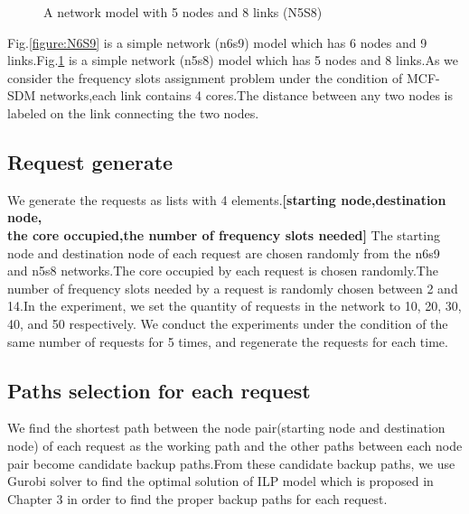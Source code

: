 \documentclass[a4paper,11pt]{report}
\begin{document}
        \begin{figure}[htbp]
        \begin{center}
        \end{center}
        \caption{A network model with 5 nodes and 8 links (N5S8)}
        \label{figure:N5S8}
        \end{figure} 

     Fig.\ref{figure:N6S9} is a simple network (n6s9) model which has 6 nodes and 9 links.Fig.\ref{figure:N5S8} is a simple network (n5s8) model which has 5 nodes and 8 links.As we consider the frequency slots assignment problem under the condition of MCF-SDM networks,each link contains 4 cores.The distance between any two nodes is labeled on the link connecting the two nodes.\par 
        
\subsection{Request generate}
    We generate the requests as lists with 4 elements.\textbf{[starting node,destination node,\\
    the core occupied,the number of frequency slots needed]}
    The starting node and destination node of each request are chosen randomly from the n6s9 and n5s8 networks.The core occupied by each request is chosen randomly.The number of frequency slots needed by a request is randomly chosen between 2 and 14.In the experiment, we set the quantity of requests in the network to 10, 20, 30, 40, and 50 respectively. We conduct the experiments under the condition of the same number of requests for 5 times, and regenerate the requests for each time.

    
\subsection{Paths selection for each request}
    We find the shortest path between the node pair(starting node and destination node) of each request as the working path and the other paths between each node pair become candidate backup paths.From these candidate backup paths, we use Gurobi solver\cite{gurobi} to find the optimal solution of ILP model which is proposed in Chapter 3 in order to find the proper backup paths for each request.\par
     
\end{document}

